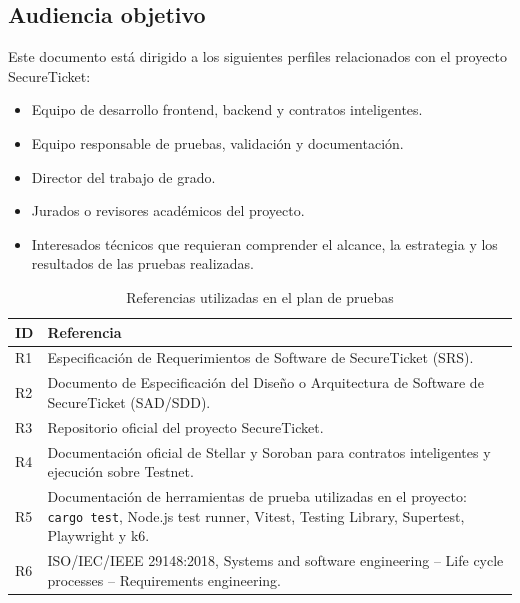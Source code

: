\documentclass[12pt,letterpaper]{article}
\newcommand{\NombreProyecto}{SecureTicket}
\begin{document}
\subsection{Audiencia objetivo}

Este documento está dirigido a los siguientes perfiles relacionados con el proyecto \NombreProyecto{}:

\begin{itemize}
    \item Equipo de desarrollo frontend, backend y contratos inteligentes.
    \item Equipo responsable de pruebas, validación y documentación.
    \item Director del trabajo de grado.
    \item Jurados o revisores académicos del proyecto.
    \item Interesados técnicos que requieran comprender el alcance, la estrategia y los resultados de las pruebas realizadas.
\end{itemize}

\begin{table}[H]
\centering

\begingroup
\footnotesize
\setlength{\tabcolsep}{4pt}
\renewcommand{\arraystretch}{1.25}

\begin{tabularx}{\textwidth}{|
>{\centering\arraybackslash}p{1.2cm}|
>{\raggedright\arraybackslash}X|}
\hline
\textbf{ID} & \textbf{Referencia} \\
\hline
R1 & Especificación de Requerimientos de Software de \NombreProyecto{} (SRS). \\
\hline
R2 & Documento de Especificación del Diseño o Arquitectura de Software de \NombreProyecto{} (SAD/SDD). \\
\hline
R3 & Repositorio oficial del proyecto \NombreProyecto{}. \\
\hline
R4 & Documentación oficial de Stellar y Soroban para contratos inteligentes y ejecución sobre Testnet. \\
\hline
R5 & Documentación de herramientas de prueba utilizadas en el proyecto: \texttt{cargo test}, Node.js test runner, Vitest, Testing Library, Supertest, Playwright y k6. \\
\hline
R6 & ISO/IEC/IEEE 29148:2018, Systems and software engineering -- Life cycle processes -- Requirements engineering. \\
\hline
\end{tabularx}

\endgroup

\caption{Referencias utilizadas en el plan de pruebas}
\label{tab:referencias-plan-pruebas}
\end{table}
\end{document}
